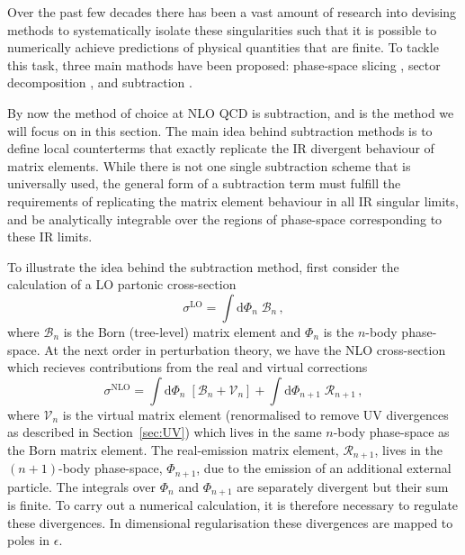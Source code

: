 \documentclass[main.tex]{subfiles}
\begin{document}
    Over the past few decades there has been a vast
    amount of research into devising methods to systematically
    isolate these singularities such that it is possible
    to numerically achieve predictions of physical
    quantities that are finite. To tackle this task, three
    main mathods have been proposed: phase-space slicing \cite{Fabricius:1981sx,Kramer:1986mc,Giele:1991vf},
    sector decomposition \cite{Binoth:2000ps,Binoth:2003ak}, and subtraction \cite{Ellis:1980nc}.
    
    By now the method of choice at NLO QCD is subtraction,
    and is the method we will focus on in this section. The main
    idea behind subtraction methods is to define local counterterms
    that exactly replicate the IR divergent behaviour of matrix
    elements. While there is not one single subtraction scheme
    that is universally used, the general form of a subtraction term
    must fulfill the requirements of replicating the matrix element
    behaviour in all IR singular limits, and be analytically integrable
    over the regions of phase-space corresponding to these IR limits.

    To illustrate the idea behind the subtraction method,
    first consider the calculation of a LO partonic cross-section
    \begin{equation}\label{eqn:LO_cs}
        \sigma^{\mathrm{LO}} = \int \mathrm{d}\Phi_{n} \; \mathcal{B}_{n} \, ,
    \end{equation}
    where $\mathcal{B}_{n}$ is the Born (tree-level) matrix
    element and $\Phi_{n}$ is the $n$-body phase-space.
    At the next order in perturbation theory, we have the NLO
    cross-section which recieves contributions from the real and virtual
    corrections
    \begin{equation}\label{eqn:NLO_cs}
        \sigma^{\mathrm{NLO}} = \int \mathrm{d}\Phi_{n} \; \left[\mathcal{B}_{n} + \mathcal{V}_{n}\right] + \int \mathrm{d}\Phi_{n+1} \; \mathcal{R}_{n+1} \, ,
    \end{equation}
    where $\mathcal{V}_{n}$ is the virtual matrix element (renormalised
    to remove UV divergences as described in Section~\ref{sec:UV})
    which lives in the same $n$-body phase-space as the Born
    matrix element. The real-emission matrix element, $\mathcal{R}_{n+1}$,
    lives in the $(n+1)$-body phase-space, $\Phi_{n+1}$, due to the emission
    of an additional external particle. The integrals over $\Phi_{n}$ and
    $\Phi_{n+1}$ are separately divergent but their sum is finite. To
    carry out a numerical calculation, it is therefore necessary
    to regulate these divergences. In dimensional regularisation these
    divergences are mapped to poles in $\epsilon$.
\end{document}
